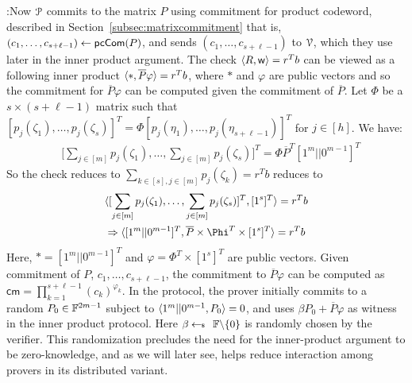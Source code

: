:Now $\prover$ commits to the matrix $P$ using commitment for product codeword, described in Section~\ref{subsec:matrixcommitment} that is, $(c_1, \ldots, c_{s+\ell -1}) \leftarrow \pccom(P)$, and sends $(c_1, \ldots, c_{s+\ell-1})$ to $\verifier$, which they use later in the inner product argument. 
The check $\innp{R}{\wit} = r^T b$ can be viewed as a following inner product $\innp{*}{\overline{P}\varphi} = r^T b$, where $*$ and $\varphi$ are public vectors and so the commitment for $\overline{P}\varphi$ can be computed given the commitment of $\overline{P}$. Let $\Phi$ be a $s \times (s + \ell - 1)$ matrix such that $[p_j(\zeta_1), \ldots, p_j(\zeta_s)]^T = \Phi[p_j(\eta_1), \ldots, p_j(\eta_{s+\ell-1})]^T$ for $j\in [h]$. We have:
\begin{align*}
&\big[ \sum_{j\in[m]} p_j(\zeta_1), \ldots,  \sum_{j\in[m]} p_j(\zeta_s)\big]^T
 = \Phi  \overline{P}^T  [1^m||0^{m-1}]^T
\end{align*}
So the check reduces to $\sum_{k\in[s], j\in[m]}p_j(\zeta_k)=r^Tb$ reduces to 
\begin{align*}
&\innp{[ \sum_{j\in[m]}  p_j(\zeta_1), \ldots, \sum_{j\in[m]} p_j(\zeta_s)]^T}{[1^s]^T} = r^Tb\\
& \Rightarrow \innp{[1^m||0^{m-1}]^T}{\overline{P}\times \Phi^T \times [1^s]^T} = r^Tb
\end{align*}
Here, $* = [1^m||0^{m-1}]^T$ and $\varphi = \Phi^T \times [1^s]^T$ are public vectors. Given commitment of $P$,  $c_1,\ldots,c_{s+\ell-1}$, the commitment to $\overline{P}\varphi$ can be computed as $\mathsf{cm}=\prod_{k=1}^{s+\ell-1}(c_k)^{\varphi_k}$. In the protocol, the prover initially commits to a random $P_0\in \FF^{2m-1}$ subject to $\innp{1^{m}|| 0^{m-1}}{P_0}=0$, and uses $\beta P_0 + \overline{P} \varphi$ as witness in the inner product protocol. Here $\beta\sample \FF\backslash \{0\}$ is randomly chosen by the verifier. This randomization precludes the need for the inner-product argument to be zero-knowledge, and as we will later see, helps reduce interaction among provers in its distributed variant.

\smallskip  

